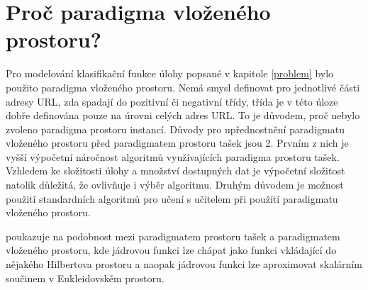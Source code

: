 \section{Proč paradigma vloženého prostoru?}
Pro modelování klasifikační funkce úlohy popsané v kapitole \ref{problem} bylo použito paradigma vloženého prostoru. Nemá smysl definovat pro jednotlivé části adresy URL, zda spadají do pozitivní či negativní třídy, třída je v této úloze dobře definována pouze na úrovni celých adres URL. To je důvodem, proč nebylo zvoleno paradigma prostoru instancí. Důvody pro upřednostnění paradigmatu vloženého prostoru před paradigmatem prostoru tašek jsou 2. Prvním z nich je vyšší výpočetní náročnost algoritmů využívajících paradigma prostoru tašek. Vzhledem ke složitosti úlohy a množství dostupných dat je výpočetní složitost natolik důležitá, že ovlivňuje i výběr algoritmu. Druhým důvodem je možnost použití standardních algoritmů pro učení s učitelem při použítí paradigmatu vloženého prostoru.
\begin{remark}
	\cite{pevny_using_2016} poukazuje na podobnost mezi paradigmatem prostoru tašek a paradigmatem vloženého prostoru, kde jádrovou funkci lze chápat jako funkci vkládající do nějakého Hilbertova prostoru a naopak jádrovou funkci lze aproximovat skalárním součinem v Eukleidovském prostoru.
\end{remark}

